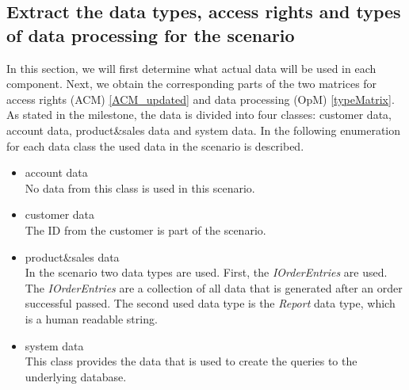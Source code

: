 \subsection{Extract the data types, access rights and types of data processing for the scenario} 
\label{accesscontrol_casestudy}
In this section, we will first determine what actual data will be used in each component. Next, we obtain the corresponding parts of the two matrices for access rights (ACM) \autoref{ACM_updated} and data processing (OpM) \autoref{typeMatrix}.\\
As stated in the milestone, the data is divided into four classes: customer data, account data, product\&sales data and system data. In the following enumeration for each data class the used data in the scenario is described.
\begin{itemize}
\item account data \\ No data from this class is used in this scenario.
\item customer data\\ The ID from the customer is part of the scenario.
\item product\&sales data\\ In the scenario two data types are used. First, the \textit{IOrderEntries} are used. The \textit{IOrderEntries} are a collection of all data that is generated after an order successful passed.  The second used data type is the \textit{Report} data type, which is a human readable string. 
\item system data \\ This class provides the data that is used to create the queries to the underlying database.
\end{itemize}

